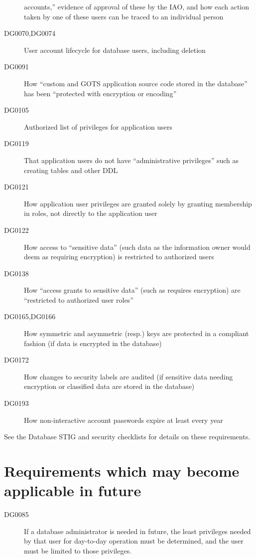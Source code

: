 \begin{description}
accounts,'' evidence of approval of these by the IAO, and how each action
taken by one of these users can be traced to an individual person
\item[DG0070,DG0074] User account lifecycle for database users, including
deletion
\item[DG0091] How ``custom and GOTS application source code stored in the
database'' has been ``protected with encryption or encoding''
\item[DG0105] Authorized list of privileges for application users
\item[DG0119] That application users do not have ``administrative
privileges'' such as creating tables and other DDL
\item[DG0121] How application user privileges are granted solely by
granting membership in roles, not directly to the application user
\item[DG0122] How access to ``sensitive data'' (such data as the
information owner would deem as requiring encryption) is restricted to
authorized users
\item[DG0138] How ``access grants to sensitive data'' (such as requires
encryption) are ``restricted to authorized user roles''
\item[DG0165,DG0166] How symmetric and asymmetric (resp.) keys are
protected in a compliant fashion (if data is encrypted in the database)
\item[DG0172] How changes to security labels are audited (if sensitive
data needing encryption or classified data are stored in the database)
\item[DG0193] How non-interactive account passwords expire at least every
year
%
\end{description}


See the Database STIG and security checklists for details on these
requirements.





\section{Requirements which may become applicable in future}
\label{DatabaseFutureRequirements}

\begin{description}
\item[DG0085] If a database administrator is needed in future, the
least privileges needed by that user for day-to-day operation must be
determined, and the user must be limited to those privileges.
\end{description}


